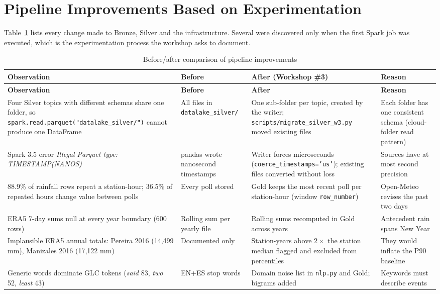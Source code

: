\documentclass[11pt,a4paper]{article}
\begin{document}
\section{Pipeline Improvements Based on Experimentation}\label{sec:improve}
Table~\ref{tab:improve} lists every change made to Bronze, Silver and the infrastructure. Several were discovered only
when the first Spark job was executed, which is the experimentation process the workshop asks to document.
\begin{longtable}{p{4.1cm}p{3.0cm}p{4.6cm}p{3.4cm}}
\caption{Before/after comparison of pipeline improvements}\label{tab:improve}\\\toprule
\textbf{Observation} & \textbf{Before} & \textbf{After (Workshop \#3)} & \textbf{Reason}\\\midrule\endfirsthead
\toprule\textbf{Observation} & \textbf{Before} & \textbf{After} & \textbf{Reason}\\\midrule\endhead
Four Silver topics with different schemas share one folder, so \texttt{spark.\allowbreak{}read.\allowbreak{}parquet(\allowbreak{}"datalake\_\allowbreak{}silver/\allowbreak{}")} cannot produce one DataFrame &
All files in \texttt{datalake\_\allowbreak{}silver/\allowbreak{}} & One sub-folder per topic, created by the writer; \texttt{scripts/\allowbreak{}migrate\_\allowbreak{}silver\_\allowbreak{}w3.\allowbreak{}py} moved existing files &
Each folder has one consistent schema (cloud-folder read pattern)\\
Spark 3.5 error \textit{Illegal Parquet type: TIMESTAMP(NANOS)} & pandas wrote nanosecond timestamps &
Writer forces microseconds (\texttt{coerce\_\allowbreak{}timestamps='us'}); existing files converted without loss & Sources have at most second precision\\
88.9\% of rainfall rows repeat a station-hour; 36.5\% of repeated hours change value between polls &
Every poll stored & Gold keeps the most recent poll per station-hour (window \texttt{row\_\allowbreak{}number}) & Open-Meteo revises the past two days\\
ERA5 7-day sums null at every year boundary (600 rows) & Rolling sum per yearly file & Rolling sums recomputed in Gold across years & Antecedent rain spans New Year\\
Implausible ERA5 annual totals: Pereira 2016 (14,499 mm), Manizales 2016 (17,122 mm) & Documented only & Station-years above $2\times$ the station median flagged and excluded from percentiles & They would inflate the P90 baseline\\
Generic words dominate GLC tokens (\textit{said} 83, \textit{two} 52, \textit{least} 43) & EN+ES stop words & Domain noise list in \texttt{nlp.\allowbreak{}py} and Gold; bigrams added & Keywords must describe events\\

\end{longtable}
\end{document}
